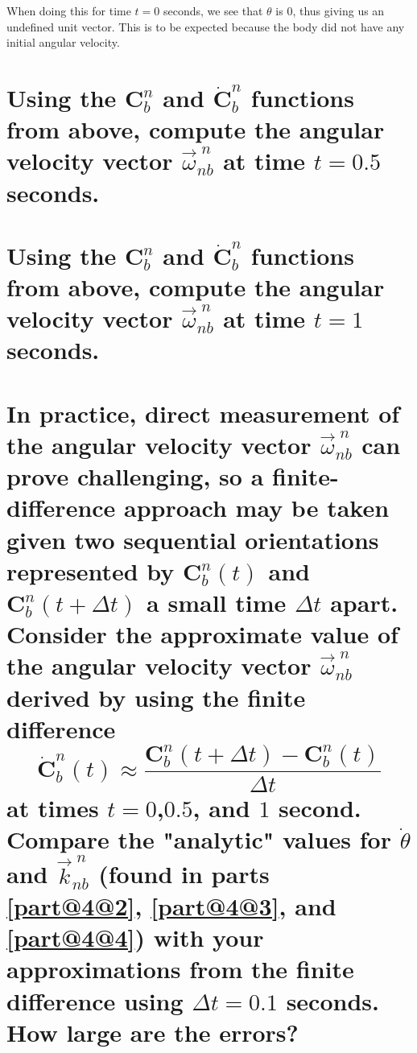 \documentclass[12pt,letterpaper, onecolumn]{exam}
\begin{document}
\begin{questions}
\begin{parts}
\begin{subparts}
{                When doing this for time $t = 0$ seconds, we see that $\theta$ is 0, thus giving us an undefined unit vector. This is to be expected because the body did not have any initial angular velocity.
            }
        \end{subparts}

        \part{Using the $\mathbf{C}^n_b$ and $\dot{\mathbf{C}}^n_b$ functions from above, compute the angular velocity vector $\vec{\omega}^{\;n}_{nb}$ at time $t = 0.5$ seconds.}
        \begin{subparts}

        \end{subparts}
        \part{Using the $\mathbf{C}^n_b$ and $\dot{\mathbf{C}}^n_b$ functions from above, compute the angular velocity vector $\vec{\omega}^{\;n}_{nb}$ at time $t = 1$ seconds.}
        \begin{subparts}

        \end{subparts}

        \part{In practice, direct measurement of the angular velocity vector $\vec{\omega}^{\;n}_{nb}$ can prove challenging, so a finite-difference approach may be taken given two sequential orientations represented by $\mathbf{C}^n_b(t)$ and $\mathbf{C}^n_b(t + \Delta t)$ a small time $\Delta t$ apart. Consider the approximate value of the angular velocity vector $\vec{\omega}^{\;n}_{nb}$ derived by using the finite difference
            \[\dot{\mathbf{C}}^n_b(t) \approx \frac{\mathbf{C}^n_b(t + \Delta t) - \mathbf{C}^n_b(t)}{\Delta t} \]
            at times $t = 0$,$0.5$, and $1$ second. Compare the "analytic" values for $\dot{\theta}$ and $\vec{k}^{\;n}_{nb}$ (found in parts \ref{part@4@2}, \ref{part@4@3}, and \ref{part@4@4}) with your approximations from the finite difference using $\Delta t = 0.1$ seconds. How large are the errors?}
    \end{parts}
    \clearpage
    \begin{parts}

\end{parts}
\end{questions}
\end{document}

